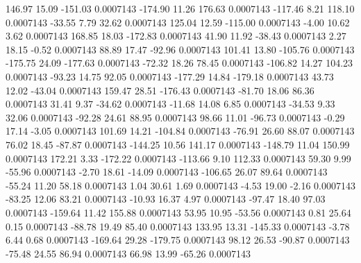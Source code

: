      146.97       15.09     -151.03     0.0007143
     -174.90       11.26      176.63     0.0007143
     -117.46        8.21      118.10     0.0007143
      -33.55        7.79       32.62     0.0007143
      125.04       12.59     -115.00     0.0007143
       -4.00       10.62        3.62     0.0007143
      168.85       18.03     -172.83     0.0007143
       41.90       11.92      -38.43     0.0007143
        2.27       18.15       -0.52     0.0007143
       88.89       17.47      -92.96     0.0007143
      101.41       13.80     -105.76     0.0007143
     -175.75       24.09     -177.63     0.0007143
      -72.32       18.26       78.45     0.0007143
     -106.82       14.27      104.23     0.0007143
      -93.23       14.75       92.05     0.0007143
     -177.29       14.84     -179.18     0.0007143
       43.73       12.02      -43.04     0.0007143
      159.47       28.51     -176.43     0.0007143
      -81.70       18.06       86.36     0.0007143
       31.41        9.37      -34.62     0.0007143
      -11.68       14.08        6.85     0.0007143
      -34.53        9.33       32.06     0.0007143
      -92.28       24.61       88.95     0.0007143
       98.66       11.01      -96.73     0.0007143
       -0.29       17.14       -3.05     0.0007143
      101.69       14.21     -104.84     0.0007143
      -76.91       26.60       88.07     0.0007143
       76.02       18.45      -87.87     0.0007143
     -144.25       10.56      141.17     0.0007143
     -148.79       11.04      150.99     0.0007143
      172.21        3.33     -172.22     0.0007143
     -113.66        9.10      112.33     0.0007143
       59.30        9.99      -55.96     0.0007143
       -2.70       18.61      -14.09     0.0007143
     -106.65       26.07       89.64     0.0007143
      -55.24       11.20       58.18     0.0007143
        1.04       30.61        1.69     0.0007143
       -4.53       19.00       -2.16     0.0007143
      -83.25       12.06       83.21     0.0007143
      -10.93       16.37        4.97     0.0007143
      -97.47       18.40       97.03     0.0007143
     -159.64       11.42      155.88     0.0007143
       53.95       10.95      -53.56     0.0007143
        0.81       25.64        0.15     0.0007143
      -88.78       19.49       85.40     0.0007143
      133.95       13.31     -145.33     0.0007143
       -3.78        6.44        0.68     0.0007143
     -169.64       29.28     -179.75     0.0007143
       98.12       26.53      -90.87     0.0007143
      -75.48       24.55       86.94     0.0007143
       66.98       13.99      -65.26     0.0007143

